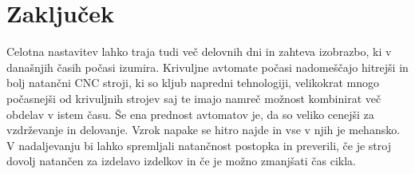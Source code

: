 \newpage
\section{Zaključek}
Celotna nastavitev lahko traja tudi več delovnih dni in zahteva
izobrazbo, ki v današnjih časih počasi izumira. Krivuljne avtomate
počasi nadomeščajo hitrejši in bolj natančni CNC stroji, ki so kljub
napredni tehnologiji, velikokrat mnogo počasnejši od krivuljnih strojev saj te
imajo namreč možnost kombinirat več obdelav v istem času. Še ena prednost avtomatov je, da so veliko cenejši
za vzdrževanje in delovanje. Vzrok napake se hitro najde in vse v njih je
mehansko. V nadaljevanju bi lahko spremljali natančnost postopka in
preverili, če je stroj dovolj natančen za izdelavo izdelkov in
če je možno zmanjšati čas cikla.